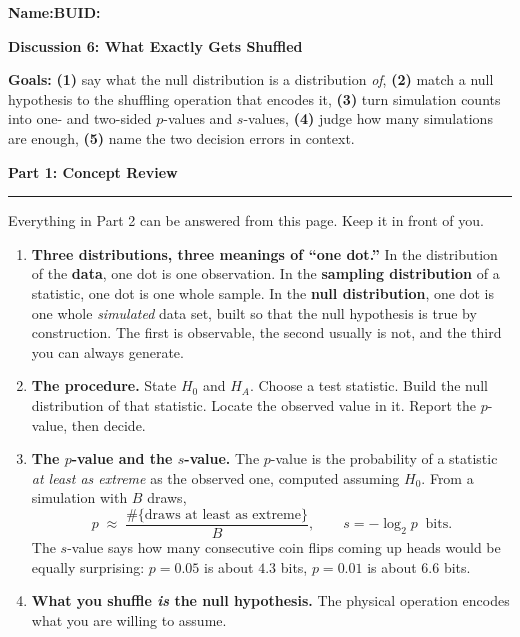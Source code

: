\documentclass[11pt]{article}
\newcommand{\blankline}[1]{\underline{\hspace{#1}}}
\newcommand{\parttitle}[1]{%
  \par\medskip\noindent
  {\large\bfseries #1}\par
  \vspace{-.5em}\noindent\rule{\linewidth}{0.4pt}\par\smallskip}
\begin{document}
\noindent\textbf{Name:}\blankline{2.3in}\hfill\textbf{BUID:}\blankline{1.6in}

\begin{center}
  {\Large\bfseries Discussion 6: What Exactly Gets Shuffled}
\end{center}

\noindent\textbf{Goals:} \textbf{(1)} say what the null distribution is a distribution \emph{of},
\textbf{(2)} match a null hypothesis to the shuffling operation that encodes it, \textbf{(3)} turn
simulation counts into one- and two-sided $p$-values and $s$-values, \textbf{(4)} judge how many
simulations are enough, \textbf{(5)} name the two decision errors in context.

\parttitle{Part 1: Concept Review}

{\small

\noindent Everything in Part 2 can be answered from this page. Keep it in front of you.

\begin{enumerate}[label=\textbf{\arabic*.}, wide=0pt, itemsep=.45em, topsep=.5em]

\item \textbf{Three distributions, three meanings of ``one dot.''} In the distribution of the
\textbf{data}, one dot is one observation. In the \textbf{sampling distribution} of a statistic,
one dot is one whole sample. In the \textbf{null distribution}, one dot is one whole
\emph{simulated} data set, built so that the null hypothesis is true by construction. The first is
observable, the second usually is not, and the third you can always generate.

\item \textbf{The procedure.} State $H_0$ and $H_A$. Choose a test statistic. Build the null
distribution of that statistic. Locate the observed value in it. Report the $p$-value, then decide.

\item \textbf{The $p$-value and the $s$-value.} The $p$-value is the probability of a statistic
\emph{at least as extreme} as the observed one, computed assuming $H_0$. From a simulation with $B$
draws,
\[
p \;\approx\; \frac{\#\{\text{draws at least as extreme}\}}{B},
\qquad
s = -\log_2 p \;\;\text{bits}.
\]
The $s$-value says how many consecutive coin flips coming up heads would be equally surprising:
$p=0.05$ is about $4.3$ bits, $p=0.01$ is about $6.6$ bits.

\item \textbf{What you shuffle \emph{is} the null hypothesis.} The physical operation encodes what
you are willing to assume.


\end{enumerate}}
\end{document}
